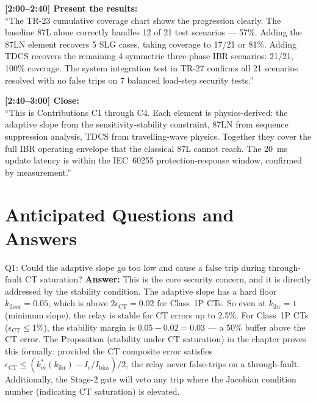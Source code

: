 \documentclass[12pt,a4paper]{article}
\newcommand{\kibr}{k_\mathrm{ibr}}
\newcommand{\kfloor}{k_\mathrm{floor}}
\begin{document}
\begin{speakbox}
\textbf{[2:00--2:40] Present the results:}\\
``The TR-23 cumulative coverage chart shows the progression clearly. The baseline 87L alone correctly handles 12 of 21 test scenarios --- 57\%. Adding the 87LN element recovers 5 SLG cases, taking coverage to 17/21 or 81\%. Adding TDCS recovers the remaining 4 symmetric three-phase IBR scenarios: 21/21, 100\% coverage. The system integration test in TR-27 confirms all 21 scenarios resolved with no false trips on 7 balanced load-step security tests.''

\textbf{[2:40--3:00] Close:}\\
``This is Contributions C1 through C4. Each element is physics-derived: the adaptive slope from the sensitivity-stability constraint, 87LN from sequence suppression analysis, TDCS from travelling-wave physics. Together they cover the full IBR operating envelope that the classical 87L cannot reach. The 20~ms update latency is within the IEC~60255 protection-response window, confirmed by measurement.''
\end{speakbox}

\section{Anticipated Questions and Answers}

\begin{keybox}{Q1: Could the adaptive slope go too low and cause a false trip during through-fault CT saturation?}
\textbf{Answer:} This is the core security concern, and it is directly addressed by the stability condition. The adaptive slope has a hard floor $\kfloor = 0.05$, which is above $2\epsilon_\mathrm{CT} = 0.02$ for Class~1P CTs. So even at $\kibr = 1$ (minimum slope), the relay is stable for CT errors up to 2.5\%. For Class~1P CTs ($\epsilon_\mathrm{CT} \leq 1\%$), the stability margin is $0.05 - 0.02 = 0.03$ --- a 50\% buffer above the CT error. The Proposition (stability under CT saturation) in the chapter proves this formally: provided the CT composite error satisfies $\epsilon_\mathrm{CT} \leq (k_m^*(\kibr) - I_c/I_\mathrm{bias})/2$, the relay never false-trips on a through-fault. Additionally, the Stage-2 gate will veto any trip where the Jacobian condition number (indicating CT saturation) is elevated.
\end{keybox}
\end{document}
